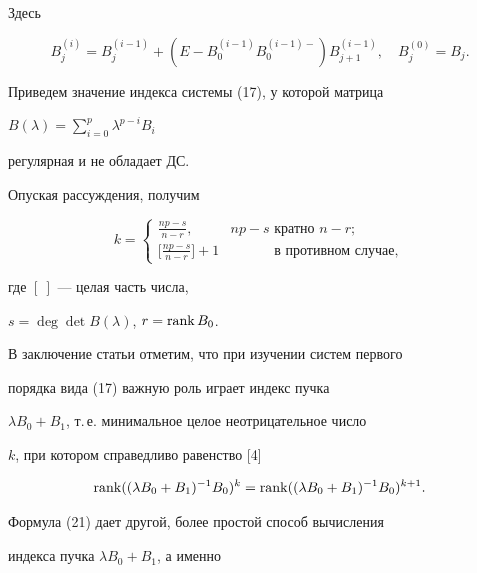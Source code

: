 


Здесь 


$$ 


B^{(i)}_j=B^{(i-1)}_j+(E-B^{(i-1)}_0B^{(i-1)-}_0) 


B^{(i-1)}_{j+1},\quad B^{(0)}_j=B_j. 


$$ 


Приведем значение индекса системы (17), у которой матрица 


$B(\lambda)=\sum\limits^p_{i=0}\lambda^{p-i}B_i$ 


регулярная и не обладает ДС. 


Опуская рассуждения, получим 


\begin{equation} 


k= 


\begin{cases} 


\displaystyle\frac{np-s}{n-r}, & np-s\text{ кратно }n-r; \\[3mm]


\displaystyle\Big[\frac{np-s}{n-r}\Big]+1 & \phantom{np-s}


\text{ в противном случае}, 


\end{cases} 


\end{equation} 


где $[\ ]$ --- целая часть числа, 


$s=\deg\det B(\lambda)$, $r=\operatorname{rank} B_0$. 


 


В заключение статьи отметим, что при изучении систем первого 


порядка вида (17) важную роль играет индекс пучка 


$\lambda B_0+B_1$, т.\,е.{} минимальное целое неотрицательное число 


$k$, при котором справедливо равенство [4]


$$ 


\rank((\lambda B_0+B_1)^{-1}B_0)^k=\rank 


((\lambda B_0+B_1)^{-1}B_0)^{k+1}. 


$$ 


 


Формула (21) дает другой, более простой способ вычисления 


индекса пучка $\lambda B_0+B_1$, а именно 


